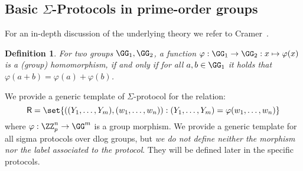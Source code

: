 \documentclass[11pt]{article}
\newtheorem{definition}{Definition}
\begin{document}

\subsection{Basic $\Sigma$-Protocols in prime-order groups}
For an in-depth discussion of the underlying theory we refer to Cramer~\cite{cramer97}.
 \begin{definition}
  For two groups $\GG_1,\GG_2$, a function $\varphi:\GG_1\to\GG_2:x\mapsto\varphi(x)$ is a \emph{(group) homomorphism}, if and only if for all $a,b\in\GG_1$ it holds that $\varphi(a+b)=\varphi(a)+\varphi(b)$.
\end{definition}




\label{sec:sigma-dlog}
We provide a generic template of $\Sigma$-protocol for the relation:
\[
  \relation=\set{((\statement_1,\dots,\statement_m),(w_1,\dots,w_n)) : (\statement_1,\dots,\statement_m)=\varphi(w_1,\dots,w_n)}
\]
where $\varphi:\ZZ_p^n\to\GG^m$ is a group morphism.
We provide a generic template for all sigma protocols over dlog groups, but \emph{we do not define neither the morphism nor the label associated to the protocol}.
They will be defined later in the specific protocols.
\end{document}
